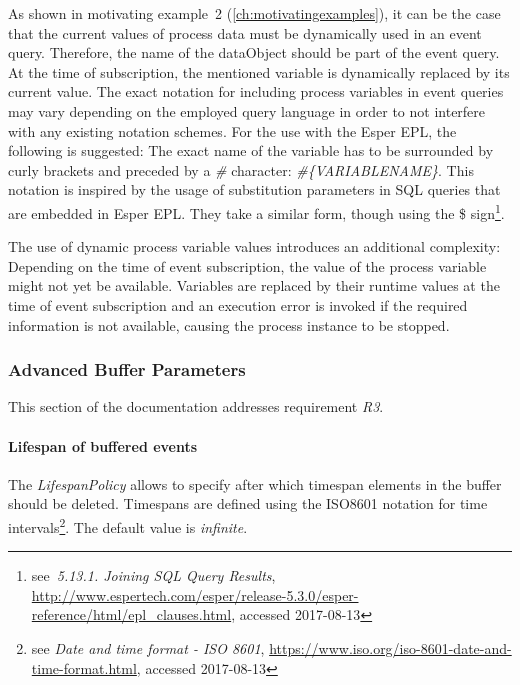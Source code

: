 
As shown in motivating example~2 (\autoref{ch:motivatingexamples}), it can be the case that the current values of process data must be dynamically used in an event query.
Therefore, the name of the dataObject should be part of the event query. At the time of subscription, the mentioned variable is dynamically replaced by its current value.
The exact notation for including process variables in event queries may vary depending on the employed query language in order to not interfere with any existing notation schemes.
For the use with the Esper EPL, the following is suggested: The exact name of the variable has to be surrounded by curly brackets and preceded by a \textit{\#} character: \textit{\#\{VARIABLENAME\}}.
This notation is inspired by the usage of substitution parameters in SQL queries that are embedded in Esper EPL. They take a similar form, though using the \$ sign\footnote{see~\textit{5.13.1. Joining SQL Query Results}, \url{http://www.espertech.com/esper/release-5.3.0/esper-reference/html/epl_clauses.html}, accessed 2017-08-13}.

The use of dynamic process variable values introduces an additional complexity: Depending on the time of event subscription, the value of the process variable might not yet be available.
Variables are replaced by their runtime values at the time of event subscription and an execution error is invoked if the required information is not available, causing the process instance to be stopped.

\subsubsection{Advanced Buffer Parameters}\label{ch:bpmnx:bufferpolicies}
This section of the documentation addresses requirement \textit{R3}.

\paragraph{Lifespan of buffered events\newline}

The \textit{LifespanPolicy} allows to specify after which timespan elements in the buffer should be deleted. Timespans are defined using the ISO8601 notation for time intervals\footnote{see \textit{Date and time format - ISO 8601}, \url{https://www.iso.org/iso-8601-date-and-time-format.html}, accessed 2017-08-13}. 
The default value is \textit{infinite}.

